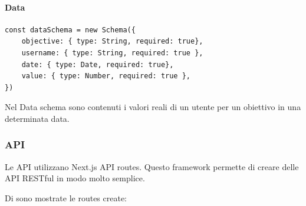 \paragraph{Data}

\begin{verbatim}
const dataSchema = new Schema({
    objective: { type: String, required: true},
    username: { type: String, required: true },
    date: { type: Date, required: true},
    value: { type: Number, required: true },
})
\end{verbatim}

Nel Data schema sono contenuti i valori reali di un utente per un obiettivo in una determinata data.

\subsubsection{API}

Le API utilizzano Next.js API routes. Questo framework permette di creare delle API RESTful in modo molto semplice.

Di sono mostrate le routes create:

